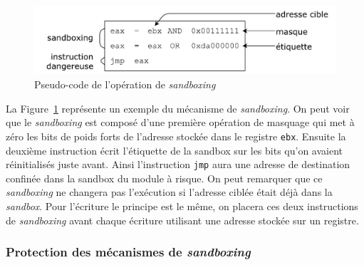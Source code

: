 \documentclass[11pt]{sdm}
\begin{document}
\begin{figure}
\centering
\includegraphics[scale=0.5]{images/algo_sandboxing.pdf}
\caption{Pseudo-code de l'opération de \textit{sandboxing}}
\label{fig:algo_sandbox}
\end{figure}

La Figure~\ref{fig:algo_sandbox} représente un exemple du mécanisme de \textit{sandboxing}. On peut voir que le \textit{sandboxing} est composé d'une première opération de masquage qui met à zéro les bits de poids forts de l'adresse stockée dans le registre \texttt{ebx}. Ensuite la deuxième instruction écrit l'étiquette de la sandbox sur les bits qu'on avaient réinitialisés juste avant. Ainsi l'instruction \texttt{jmp} aura une adresse de destination confinée dans la sandbox du module à risque. On peut remarquer que ce \textit{sandboxing} ne changera pas l'exécution si l'adresse ciblée était déjà dans la \textit{sandbox}. Pour l'écriture le principe est le même, on placera ces deux instructions de \textit{sandboxing} avant chaque écriture utilisant une adresse stockée sur un registre.

\subsubsection{Protection des mécanismes de \textit{sandboxing}}
\end{document}

